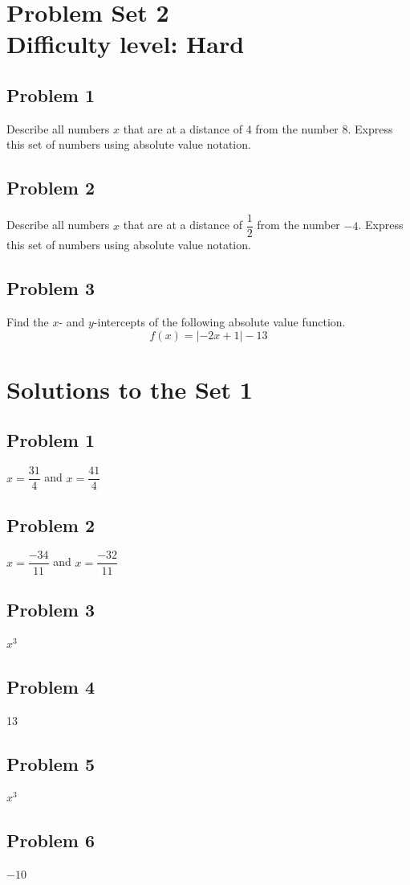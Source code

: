 \documentclass[12pt]{article}
\begin{document}
\section*{Problem Set 2\\Difficulty level: Hard}
\subsection*{Problem 1}
Describe all numbers \(x\) that are at a distance of 4 from the number 8. Express this set of numbers using absolute value notation.

\subsection*{Problem 2}
Describe all numbers \(x\) that are at a distance of \(\dfrac{1}{2}\) from the number \(-4\). Express this set of numbers using absolute value notation.

\subsection*{Problem 3}
Find the \(x\)- and \(y\)-intercepts of the following absolute value function.
\[f(x)=|-2x+1|-13\]

\newpage
\section*{Solutions to the Set 1}
\subsection*{Problem 1}
\(x=\dfrac{31}{4}\) and \(x=\dfrac{41}{4}\)
\subsection*{Problem 2}
\(x=\dfrac{-34}{11}\) and \(x=\dfrac{-32}{11}\)
\subsection*{Problem 3}
\(x^3\)
\subsection*{Problem 4}
13
\subsection*{Problem 5}
\(x^3\)

\subsection*{Problem 6}
\(-10\)
\end{document}
